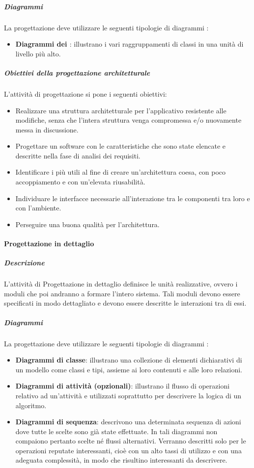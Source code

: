 \subparagraph{Diagrammi}
La progettazione deve utilizzare le seguenti tipologie di diagrammi :
\begin{itemize}
\item
\textbf{Diagrammi dei \textit{}}: illustrano i vari raggruppamenti di classi in una unità di livello più alto.
\end{itemize}

\subparagraph{Obiettivi della progettazione architetturale}
L'attività di progettazione si pone i seguenti obiettivi:
\begin{itemize}
\item Realizzare una struttura architetturale per l'applicativo  resistente alle modifiche, senza che l'intera struttura venga compromessa e/o nuovamente messa in discussione.
\item Progettare un software con le caratteristiche che sono state elencate e descritte nella fase di analisi dei requisiti.
\item Identificare i  più utili al fine di creare un'architettura coesa, con poco accoppiamento e con un'elevata riusabilità.
\item Individuare le interfacce necessarie all'interazione tra le componenti tra loro e con l'ambiente.
\item Perseguire una buona qualità per l'architettura.
\end{itemize}

\paragraph{Progettazione in dettaglio}

\subparagraph{Descrizione}
L'attività di Progettazione in dettaglio definisce le unità realizzative, ovvero i moduli che poi andranno a formare l'intero sistema. Tali moduli devono essere specificati in modo dettagliato e devono essere descritte le interazioni tra di essi.

\subparagraph{Diagrammi}
La progettazione deve utilizzare le seguenti tipologie di diagrammi :
\begin{itemize}
\item
\textbf{Diagrammi di classe}: illustrano una collezione di elementi dichiarativi di un modello come classi e tipi, assieme ai loro contenuti e alle loro relazioni.
\item
\textbf{Diagrammi di attività (opzionali)}: illustrano il flusso di operazioni relativo ad un'attività e utilizzati soprattutto per descrivere la logica di un algoritmo.
\item
\textbf{Diagrammi di sequenza}: descrivono una determinata sequenza di azioni dove tutte le scelte sono già state effettuate. In tali diagrammi non compaiono pertanto scelte né flussi alternativi. Verranno descritti solo per le operazioni reputate interessanti, cioè con un alto tassi di utilizzo e con una adeguata complessità, in modo che risultino interessanti da descrivere.
\end{itemize}

